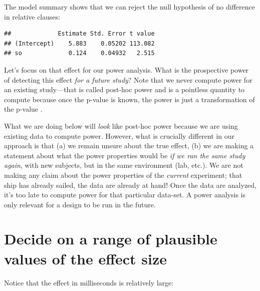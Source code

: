\documentclass[12pt,]{krantz}
\newenvironment{Shaded}{\begin{snugshade}}{\end{snugshade}}
\newcommand{\CommentTok}[1]{\textcolor[rgb]{0.56,0.35,0.01}{\textit{#1}}}
\newcommand{\DecValTok}[1]{\textcolor[rgb]{0.00,0.00,0.81}{#1}}
\newcommand{\FloatTok}[1]{\textcolor[rgb]{0.00,0.00,0.81}{#1}}
\newcommand{\KeywordTok}[1]{\textcolor[rgb]{0.13,0.29,0.53}{\textbf{#1}}}
\newcommand{\NormalTok}[1]{#1}
\newcommand{\OperatorTok}[1]{\textcolor[rgb]{0.81,0.36,0.00}{\textbf{#1}}}
\newcommand{\StringTok}[1]{\textcolor[rgb]{0.31,0.60,0.02}{#1}}
\begin{document}
The model summary shows that we can reject the null hypothesis of no difference in relative clauses:

\begin{Shaded}
\end{Shaded}

\begin{verbatim}
##             Estimate Std. Error t value
## (Intercept)    5.883    0.05202 113.082
## so             0.124    0.04932   2.515
\end{verbatim}

Let's focus on that effect for our power analysis. What is the prospective power of detecting this effect \emph{for a future study}? Note that we never compute power for an existing study---that is called post-hoc power and is a pointless quantity to compute because once the p-value is known, the power is just a transformation of the p-value \citep{hoenigheisey}.

What we are doing below will \emph{look} like post-hoc power because we are using existing data to compute power. However, what is crucially different in our approach is that (a) we remain unsure about the true effect, (b) we are making a statement about what the power properties would be \emph{if we ran the same study again}, with new subjects, but in the same environment (lab, etc.). We are not making any claim about the power properties of the \emph{current} experiment; that ship has already sailed, the data are already at hand! Once the data are analyzed, it's too late to compute power for that particular data-set. A power analysis is only relevant for a design to be run in the future.

\hypertarget{decide-on-a-range-of-plausible-values-of-the-effect-size}{%
\section{Decide on a range of plausible values of the effect size}\label{decide-on-a-range-of-plausible-values-of-the-effect-size}}

Notice that the effect in milliseconds is relatively large:

\begin{Shaded}
\end{Shaded}
\end{document}
